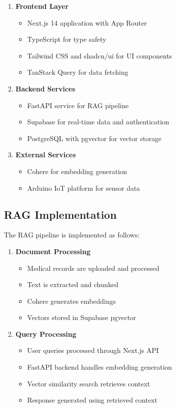 \begin{enumerate}
    \item \textbf{Frontend Layer}
    \begin{itemize}
        \item Next.js 14 application with App Router
        \item TypeScript for type safety
        \item Tailwind CSS and shadcn/ui for UI components
        \item TanStack Query for data fetching
    \end{itemize}

    \item \textbf{Backend Services}
    \begin{itemize}
        \item FastAPI service for RAG pipeline
        \item Supabase for real-time data and authentication
        \item PostgreSQL with pgvector for vector storage
    \end{itemize}

    \item \textbf{External Services}
    \begin{itemize}
        \item Cohere for embedding generation
        \item Arduino IoT platform for sensor data
    \end{itemize}
\end{enumerate}

\subsection{RAG Implementation}
The RAG pipeline is implemented as follows:

\begin{enumerate}
    \item \textbf{Document Processing}
    \begin{itemize}
        \item Medical records are uploaded and processed
        \item Text is extracted and chunked
        \item Cohere generates embeddings
        \item Vectors stored in Supabase pgvector
    \end{itemize}

    \item \textbf{Query Processing}
    \begin{itemize}
        \item User queries processed through Next.js API
        \item FastAPI backend handles embedding generation
        \item Vector similarity search retrieves context
        \item Response generated using retrieved context
    \end{itemize}
\end{enumerate}

